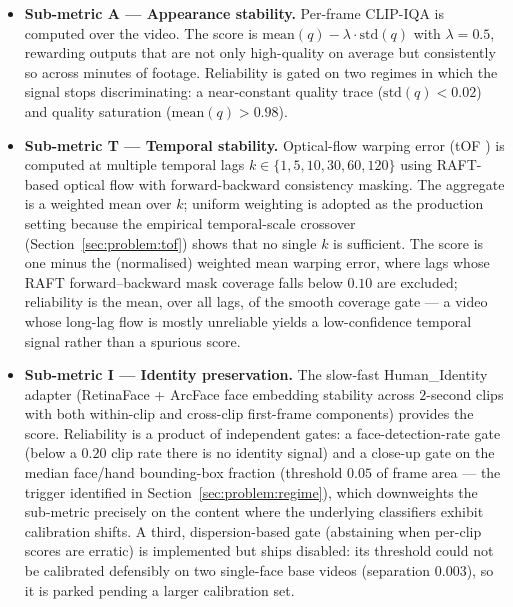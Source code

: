 \begin{itemize}
    \item \textbf{Sub-metric A --- Appearance stability.} Per-frame CLIP-IQA
          \cite{wang_clipiqa_2023} is computed over the video. The score is
          $\mathrm{mean}(q) - \lambda \cdot \mathrm{std}(q)$ with $\lambda = 0.5$,
          rewarding outputs that are not only high-quality on average but
          consistently so across minutes of footage. Reliability is gated on two
          regimes in which the signal stops discriminating: a near-constant quality
          trace ($\mathrm{std}(q) < 0.02$) and quality saturation
          ($\mathrm{mean}(q) > 0.98$).

    \item \textbf{Sub-metric T --- Temporal stability.} Optical-flow warping error (tOF
          \cite{chu_tecogan_2020}) is computed at multiple temporal lags
          $k \in \{1, 5, 10, 30, 60, 120\}$ using RAFT-based optical flow with
          forward-backward consistency masking. The aggregate is a weighted mean over
          $k$; uniform weighting is adopted as the production setting because the
          empirical temporal-scale crossover (Section~\ref{sec:problem:tof}) shows that
          no single $k$ is sufficient. The score is one minus the (normalised) weighted
          mean warping error, where lags whose RAFT forward--backward mask coverage
          falls below $0.10$ are excluded; reliability is the mean, over all lags, of
          the smooth coverage gate --- a video whose long-lag flow is mostly
          unreliable yields a low-confidence temporal signal rather than a spurious
          score.

    \item \textbf{Sub-metric I --- Identity preservation.} The slow-fast Human\_Identity
          adapter (RetinaFace + ArcFace face embedding stability across $2$-second clips
          with both within-clip and cross-clip first-frame components) provides the
          score. Reliability is a product of independent gates: a face-detection-rate
          gate (below a $0.20$ clip rate there is no identity signal) and a close-up
          gate on the median face/hand bounding-box fraction (threshold $0.05$ of
          frame area --- the trigger identified in
          Section~\ref{sec:problem:regime}), which downweights the sub-metric
          precisely on the content where the underlying classifiers exhibit
          calibration shifts. A third, dispersion-based gate (abstaining when
          per-clip scores are erratic) is implemented but ships disabled: its
          threshold could not be calibrated defensibly on two single-face base
          videos (separation $0.003$), so it is parked pending a larger calibration
          set.


\end{itemize}
